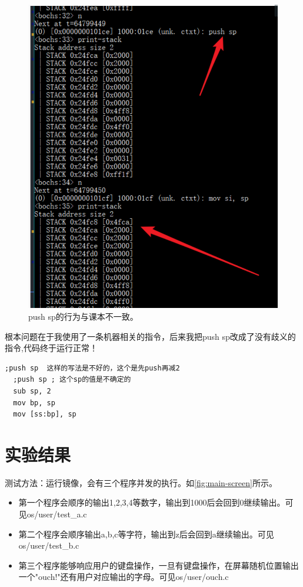 \documentclass[forprint]{WHUBachelor}
\begin{document}
\begin{figure}[htp]
  \centering
  \includegraphics[width=13cm]{"./figure/2018-04-17-10-47-21.png"}
  \caption{push sp的行为与课本不一致。}
  \label{fig:push-sp}
\end{figure}

根本问题在于我使用了一条机器相关的指令，后来我把push sp改成了没有歧义的指令,代码终于运行正常！

\begin{lstlisting}[language={[x86masm]Assembler}]
  ;push sp  这样的写法是不好的，这个是先push再减2
  ;push sp ; 这个sp的值是不确定的
  sub sp, 2
  mov bp, sp
  mov [ss:bp], sp
\end{lstlisting}


\chapter{实验结果}

测试方法：运行镜像，会有三个程序并发的执行。如\autoref{fig:main-screen}所示。

\begin{itemize}
  \item   第一个程序会顺序的输出1,2,3,4等数字，输出到1000后会回到0继续输出。可见os/user/test\_a.c
  \item 第二个程序会顺序输出a,b,c等字符，输出到z后会回到a继续输出。可见os/user/test\_b.c
  \item 第三个程序能够响应用户的键盘操作，一旦有键盘操作，在屏幕随机位置输出一个"ouch!"还有用户对应输出的字母。可见os/user/ouch.c
\end{itemize}
\end{document}
